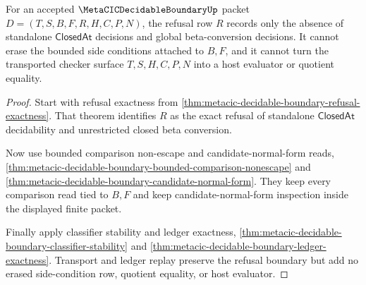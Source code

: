 \begin{theorem}
\label{thm:metacic-decidable-boundary-closedat-refusal-scope}
For an accepted $\MetaCICDecidableBoundaryUp$ packet $D=(T,S,B,F,R,H,C,P,N)$, the refusal row $R$ records only the absence of standalone $\mathsf{ClosedAt}$ decisions and global beta-conversion decisions. It cannot erase the bounded side conditions attached to $B,F$, and it cannot turn the transported checker surface $T,S,H,C,P,N$ into a host evaluator or quotient equality.
\end{theorem}
\begin{proof}
Start with refusal exactness from \autoref{thm:metacic-decidable-boundary-refusal-exactness}. That theorem identifies $R$ as the exact refusal of standalone $\mathsf{ClosedAt}$ decidability and unrestricted closed beta conversion.

Now use bounded comparison non-escape and candidate-normal-form reads, \autoref{thm:metacic-decidable-boundary-bounded-comparison-nonescape} and \autoref{thm:metacic-decidable-boundary-candidate-normal-form}. They keep every comparison read tied to $B,F$ and keep candidate-normal-form inspection inside the displayed finite packet.

Finally apply classifier stability and ledger exactness, \autoref{thm:metacic-decidable-boundary-classifier-stability} and \autoref{thm:metacic-decidable-boundary-ledger-exactness}. Transport and ledger replay preserve the refusal boundary but add no erased side-condition row, quotient equality, or host evaluator.
\end{proof}

